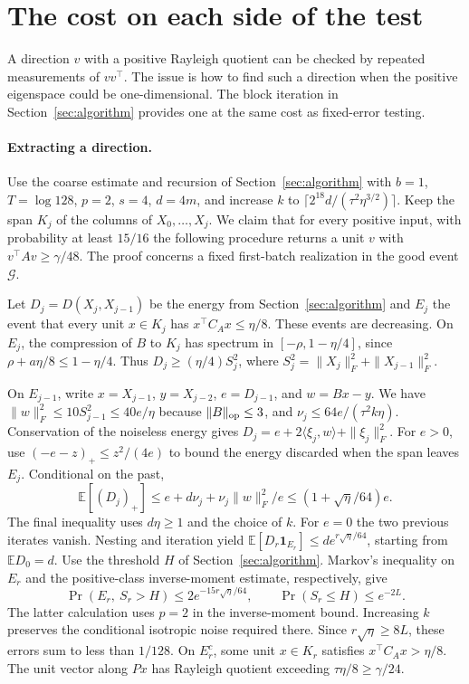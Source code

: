 \section{The cost on each side of the test}\label{sec:classwise}

A direction \(v\) with a positive Rayleigh quotient can be checked by repeated measurements of \(vv^\top\). The issue is how to find such a direction when the positive eigenspace could be one-dimensional. The block iteration in Section~\ref{sec:algorithm} provides one at the same cost as fixed-error testing.

\paragraph{Extracting a direction.}
Use the coarse estimate and recursion of Section~\ref{sec:algorithm} with \(b=1\), \(T=\log 128\), \(p=2\), \(s=4\), \(d=4m\), and increase \(k\) to \(\lceil 2^{18}d/(\tau^2\eta^{3/2})\rceil\). Keep the span \(K_j\) of the columns of \(X_0,\ldots,X_j\). We claim that for every positive input, with probability at least \(15/16\) the following procedure returns a unit \(v\) with \(v^\top A v\ge\gamma/48\). The proof concerns a fixed first-batch realization in the good event \(\mathcal G\).

Let \(D_j=D(X_j,X_{j-1})\) be the energy from Section~\ref{sec:algorithm} and \(E_j\) the event that every unit \(x\in K_j\) has \(x^\top C_A x\le\eta/8\). These events are decreasing. On \(E_j\), the compression of \(B\) to \(K_j\) has spectrum in \([-\rho,1-\eta/4]\), since \(\rho+a\eta/8\le1-\eta/4\). Thus \(D_j\ge(\eta/4) S_j^2\), where \(S_j^2=\|X_j\|_F^2+\|X_{j-1}\|_F^2\).

On \(E_{j-1}\), write \(x=X_{j-1}\), \(y=X_{j-2}\), \(e=D_{j-1}\), and \(w=Bx-y\). We have \(\|w\|_F^2\le10S_{j-1}^2\le40e/\eta\) because \(\|B\|_{\rm op}\le3\), and \(\nu_j\le64e/(\tau^2 k\eta)\). Conservation of the noiseless energy gives \(D_j=e+2\langle \xi_j,w\rangle+\|\xi_j\|_F^2\). For \(e>0\), use \((-e-z)_+\le z^2/(4e)\) to bound the energy discarded when the span leaves \(E_j\). Conditional on the past,
\[
 \mathbb E[(D_j)_+]\le e+d\nu_j+\nu_j\|w\|_F^2/e
 \le (1+\sqrt\eta/64)e .
\]
The final inequality uses \(d\eta\ge1\) and the choice of \(k\). For \(e=0\) the two previous iterates vanish. Nesting and iteration yield \(\mathbb E[D_r\mathbf 1_{E_r}]\le d e^{r\sqrt\eta/64}\), starting from \(\mathbb E D_0=d\). Use the threshold \(H\) of Section~\ref{sec:algorithm}. Markov's inequality on \(E_r\) and the positive-class inverse-moment estimate, respectively, give
\[
 \Pr(E_r,\ S_r>H)\le2e^{-15r\sqrt\eta/64},\qquad
 \Pr(S_r\le H)\le e^{-2L}.
\]
The latter calculation uses \(p=2\) in the inverse-moment bound. Increasing \(k\) preserves the conditional isotropic noise required there. Since \(r\sqrt\eta\ge8L\), these errors sum to less than \(1/128\). On \(E_r^c\), some unit \(x\in K_r\) satisfies \(x^\top C_A x>\eta/8\). The unit vector along \(Px\) has Rayleigh quotient exceeding \(\tau\eta/8\ge\gamma/24\).

